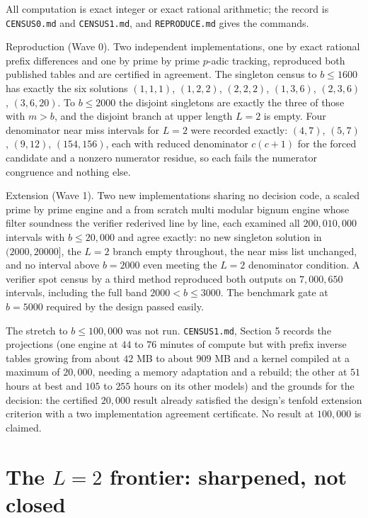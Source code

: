 \documentclass[11pt]{article}
\theoremstyle{remark}
\begin{document}
All computation is exact integer or exact rational arithmetic; the record is \texttt{CENSUS0.md} and \texttt{CENSUS1.md}, and \texttt{REPRODUCE.md} gives the commands.

Reproduction (Wave 0). Two independent implementations, one by exact rational prefix differences and one by prime by prime $p$-adic tracking, reproduced both published tables and are certified in agreement. The singleton census to $b \le 1600$ has exactly the six solutions $(1,1,1)$, $(1,2,2)$, $(2,2,2)$, $(1,3,6)$, $(2,3,6)$, $(3,6,20)$. To $b \le 2000$ the disjoint singletons are exactly the three of those with $m > b$, and the disjoint branch at upper length $L = 2$ is empty. Four denominator near miss intervals for $L = 2$ were recorded exactly: $(4,7)$, $(5,7)$, $(9,12)$, $(154,156)$, each with reduced denominator $c(c+1)$ for the forced candidate and a nonzero numerator residue, so each fails the numerator congruence and nothing else.

Extension (Wave 1). Two new implementations sharing no decision code, a scaled prime by prime engine and a from scratch multi modular bignum engine whose filter soundness the verifier rederived line by line, each examined all $200{,}010{,}000$ intervals with $b \le 20{,}000$ and agree exactly: no new singleton solution in $(2000, 20000]$, the $L = 2$ branch empty throughout, the near miss list unchanged, and no interval above $b = 2000$ even meeting the $L = 2$ denominator condition. A verifier spot census by a third method reproduced both outputs on $7{,}000{,}650$ intervals, including the full band $2000 < b \le 3000$. The benchmark gate at $b = 5000$ required by the design passed easily.

The stretch to $b \le 100{,}000$ was not run. \texttt{CENSUS1.md}, Section 5 records the projections (one engine at $44$ to $76$ minutes of compute but with prefix inverse tables growing from about $42$ MB to about $909$ MB and a kernel compiled at a maximum of $20{,}000$, needing a memory adaptation and a rebuild; the other at $51$ hours at best and $105$ to $255$ hours on its other models) and the grounds for the decision: the certified $20{,}000$ result already satisfied the design's tenfold extension criterion with a two implementation agreement certificate. No result at $100{,}000$ is claimed.

\section{The $L = 2$ frontier: sharpened, not closed}
\end{document}
